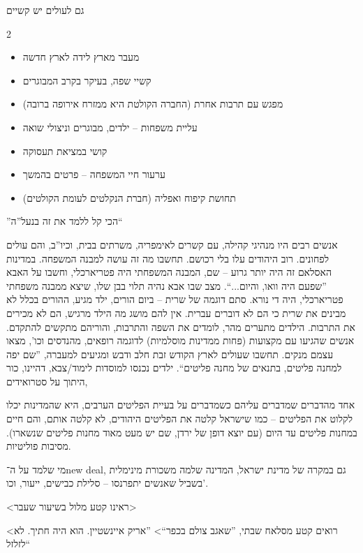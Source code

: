 \documentclass[]{../../../../tex/classes/styledArticle}
\begin{document}
	גם לעולים יש קשיים
	\begin{multicols}{2}
		\begin{itemize}
			\item מעבר מארץ לידה לארץ חדשה
			\item קשיי שפה, בעיקר בקרב המבוגרים
			\item מפגש עם תרבות אחרת (החברה הקולטת היא ממזרח אירופה ברובה)
			\item עליית משפחות – ילדים, מבוגרים וניצולי שואה
			\item קושי במציאת תעסוקה
			\item ערעור חיי המשפחה – פרטים בהמשך
			\item תחושת קיפוח ואפליה (חברת הנקלטים לעומת הקולטים)
		\end{itemize}
	\end{multicols}
	''הכי קל ללמד את זה בנעל''ה``
	
	אנשים רבים היו מנהיגי קהילה, עם קשרים לאימפריה, משרתים בבית, וכיו''ב, והם עולים לפחונים. רוב היהודים עלו בלי רכושם. תחשבו מה זה עושה למבנה המשפחה. במדינות האסלאם זה היה יותר גרוע – שם, המבנה המשפחתי היה פטריארכלי, וחשבו על האבא ''שפעם היה וואו, והיום...``. מצב שבו אבא נהיה תלוי בבן שלו, שיצא ממבנה משפחתי פטריארכלי, היה די נורא. סתם דוגמה של שרית – ביום הורים, ילד מגיע, ההורים בכלל לא מבינים את שרית כי הם לא דוברים עברית. אין להם מושג מה הילד מרגיש, הם לא מכירים את התרבות. הילדים מתערים מהר, לומדים את השפה והתרבות, והוריהם מתקשים להתקדם. אנשים שהגיעו עם מקצועות (פחות ממדינות מוסלמיות) לדוגמה רופאים, מהנדסים וכו', מצאו עצמם מנקים. תחשבו שעולים לארץ הקודש זבת חלב ודבש ומגיעים למעברה, ''שם יפה למחנה פליטים, בתנאים של מחנה פליטים``. ילדים נכנסו למוסדות לימוד/צבא, דהיינו, כור היתוך על סטרואידים, 
	
	אחד מהדברים שמדברים עליהם כשמדברים על בעיית הפליטים הערבים, היא שהמדינות יכלו לקלוט את הפליטים – כמו שישראל קלטה את הפליטים היהודים, לא קלטה אותם, והם חיים במחנות פליטים עד היום (עם יוצא דופן של ירדן, שם יש מעט מאוד מחנות פליטים שנשארו). מסיבות פוליטיות. 
	
	מי שלמד על ה־new deal, גם במקרה של מדינת ישראל, המדינה שלמה משכורת מינימלית בשביל שאנשים יתפרנסו – סלילת כבישים, ייעור, וכו'. 
	
	<ראינו קטע מלול בשיעור שעבר>
	
	<רואים קטע מסלאח שבתי, ''שאגב צולם בכפר``> ''אריק איינשטיין. הוא היה חתיך. לא לזלזל``
	
\end{document}
